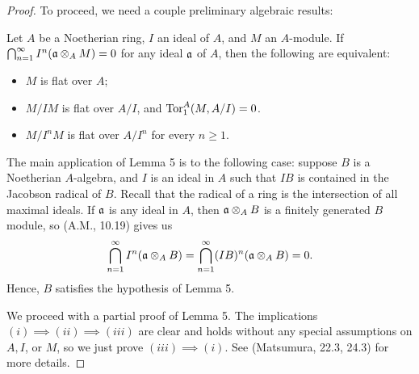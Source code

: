 \documentclass[a4paper]{article}
\begin{document}
\begin{enumerate} [label=\textbf{\arabic*.}, leftmargin=0em]
\begin{proof}
          To proceed, we need a couple preliminary algebraic results:

          \begin{lemma} [Matsumura, 22.3]
            Let $A$ be a Noetherian ring, $I$ an ideal of $A$, and $M$ an $A$-module.
            If $\bigcap_{n = 1}^\infty I^n(\mathfrak{a} \otimes_A M) = 0$ for any ideal $\mathfrak{a}$ of $A$, then the following are equivalent:
            \begin{itemize}
              \item[(i)] $M$ is flat over $A$;
              \item[(ii)] $M/IM$ is flat over $A / I$, and $\operatorname{Tor}_1^A(M, A / I) = 0$.
              \item[(iii)] $M / I^nM$ is flat over $A / I^n$ for every $n \geq 1$.
            \end{itemize}
          \end{lemma}
          The main application of Lemma 5 is to the following case: suppose $B$ is a Noetherian $A$-algebra, and $I$ is an ideal in $A$ such that $IB$ is contained in the Jacobson radical of $B$.
          Recall that the radical of a ring is the intersection of all maximal ideals.
          If $\mathfrak{a}$ is any ideal in $A$, then $\mathfrak{a} \otimes_A B$ is a finitely generated $B$ module, so (A.M., 10.19) gives us
          \begin{equation*}
            \bigcap_{n = 1}^\infty I^n(\mathfrak{a} \otimes_A B) = \bigcap_{n = 1}^\infty (IB)^n (\mathfrak{a} \otimes_A B) = 0.
          \end{equation*}
          Hence, $B$ satisfies the hypothesis of Lemma 5.

          We proceed with a partial proof of Lemma 5.
          The implications $(i) \implies (ii) \implies (iii)$ are clear and holds without any special assumptions on $A, I$, or $M$, so we just prove $(iii) \implies (i)$.
          See (Matsumura, 22.3, 24.3) for more details.


\end{proof}
\end{enumerate}
\end{document}
